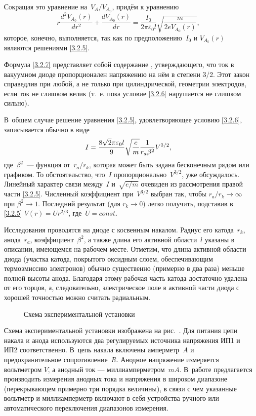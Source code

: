 Сокращая это уравнение на~$V_A/V_{A_0}$, придём к уравнению
\begin{equation*}
	r\frac{d^2V_{A_0}(r)}{dr^2}+
\frac{dV_{A_0}(r)}{dr}=\frac{I_0}{2\pi\varepsilon_0l}\sqrt{\frac{m}{2eV_{A_0}(r)
}},
\end{equation*}
которое, конечно, выполняется, так как по предположению~$I_0$ и $V_{A_0}(r)$
являются решениями \eqref{3.2.5}.

Формула \eqref{3.2.7} представляет собой содержание , утверждающего, что ток в вакуумном диоде пропорционален напряжению на
нём в степени 3/2. Этот закон справедлив при любой, а не только при
цилиндрической, геометрии электродов, если ток не слишком велик (т.~е. пока
условие \eqref{3.2.6} нарушается не слишком сильно).

В~общем случае решение уравнения \eqref{3.2.5}, удовлетворяющее условию
\eqref{3.2.6}, записывается обычно в виде
\begin{equation}
I=\frac{8\sqrt{2}\pi\varepsilon_0l}{9}
\sqrt{\frac{e}{m}}\frac{1}{r_a\beta^2}V^{3/2},
	\eqmark{3.2.8}
\end{equation}
где~$\beta^2$~--- функция от~$r_a/r_k$, которая может быть задана бесконечным
рядом или графиком. То обстоятельство, что~$I$ пропорционально~$V^{3/2}$, уже
обсуждалось. Линейный характер связи между~$I$ и~$\sqrt{e/m}$ очевиден из
рассмотрения правой части \eqref{3.2.5}. Численный коэффициент при~$V^{3/2}$
выбран так, чтобы $r_a/r_k\rightarrow\infty$ при $\beta^2\rightarrow 1$.
Последний результат (для $r_k\rightarrow 0$) легко получить, подставив в
\eqref{3.2.5} $V(r)=Ur^{2/3} $, где~$U=const$.

\experiment Исследования проводятся на диоде с косвенным накалом. Радиус его
катода~$r_k$, анода~$r_a$,  коэффициент~$\beta^2$, а также длина его активной
области~$l$  указаны в описании, имеющемся на рабочем месте. Отметим, что длина
активной области диода (участка катода, покрытого оксидным слоем, обеспечивающим
термоэмиссию электронов) обычно существенно (примерно в два раза) меньше полной
высоты анода. Благодаря этому рабочая часть катода достаточно удалена от его
торцов, а, следовательно,  электрическое поле в активной части диода с хорошей
точностью можно считать радиальным.
\begin{figure}[h!]
	\caption{Схема экспериментальной установки}
\end{figure}

Схема экспериментальной установки изображена на рис.~. Для
питания цепи накала и анода используются два регулируемых источника напряжения
ИП1 и ИП2 соответственно. В~цепь накала включены амперметр~$A$ и
предохранительное сопротивление~$R$. Анодное напряжение измеряется вольтметром
$V$, а анодный ток --- миллиамперметром~$mA$. В~работе предлагается производить
измерения анодных тока и напряжения в широком диапазоне (перекрывающем примерно
три порядка величины), в связи с чем указанные вольтметр и миллиамперметр
включают в себя устройства ручного или автоматического переключения диапазонов
измерения.

